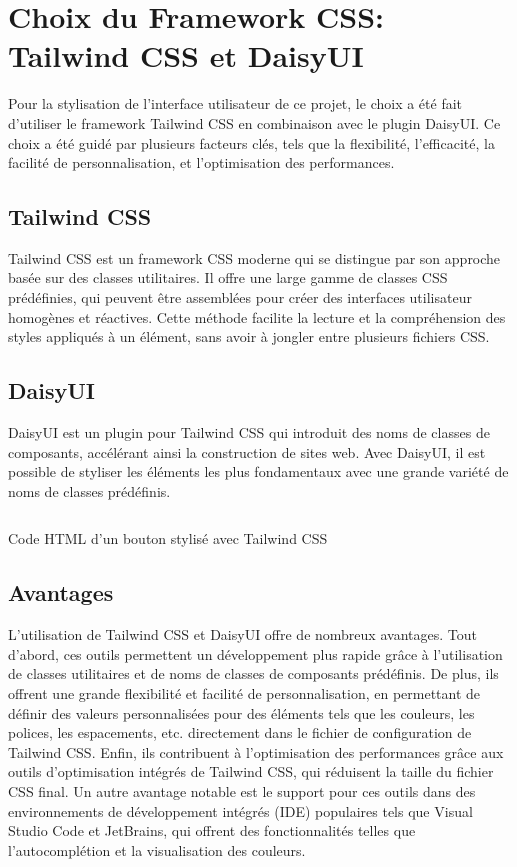 \section{Choix du Framework CSS: Tailwind CSS et DaisyUI}

Pour la stylisation de l'interface utilisateur de ce projet, le choix a été fait d'utiliser le framework Tailwind CSS en combinaison avec le plugin DaisyUI. Ce choix a été guidé par plusieurs facteurs clés, tels que la flexibilité, l'efficacité, la facilité de personnalisation, et l'optimisation des performances.

\subsection{Tailwind CSS}

Tailwind CSS est un framework CSS moderne qui se distingue par son approche basée sur des classes utilitaires. Il offre une large gamme de classes CSS prédéfinies, qui peuvent être assemblées pour créer des interfaces utilisateur homogènes et réactives. Cette méthode facilite la lecture et la compréhension des styles appliqués à un élément, sans avoir à jongler entre plusieurs fichiers CSS.

\subsection{DaisyUI}

DaisyUI est un plugin pour Tailwind CSS qui introduit des noms de classes de composants, accélérant ainsi la construction de sites web. Avec DaisyUI, il est possible de styliser les éléments les plus fondamentaux avec une grande variété de noms de classes prédéfinis.

\begin{listing}[H]
    \inputminted{HTML}{assets/code/tailwind-example.html}
    \caption{Code HTML d'un bouton stylisé avec Tailwind CSS\label{fig:tailwind-example}}
\end{listing}

\subsection{Avantages}

L'utilisation de Tailwind CSS et DaisyUI offre de nombreux avantages. Tout d'abord, ces outils permettent un développement plus rapide grâce à l'utilisation de classes utilitaires et de noms de classes de composants prédéfinis. De plus, ils offrent une grande flexibilité et facilité de personnalisation, en permettant de définir des valeurs personnalisées pour des éléments tels que les couleurs, les polices, les espacements, etc. directement dans le fichier de configuration de Tailwind CSS. Enfin, ils contribuent à l'optimisation des performances grâce aux outils d'optimisation intégrés de Tailwind CSS, qui réduisent la taille du fichier CSS final. Un autre avantage notable est le support pour ces outils dans des environnements de développement intégrés (IDE) populaires tels que Visual Studio Code et JetBrains, qui offrent des fonctionnalités telles que l'autocomplétion et la visualisation des couleurs.

